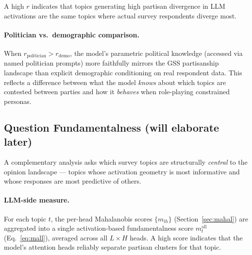 A high $r$ indicates that topics generating high partisan divergence in LLM activations are the same topics where actual survey respondents diverge most.

\paragraph{Politician vs.\ demographic comparison.}
When $r_\text{politician} > r_\text{demo}$, the model's parametric political knowledge (accessed via named politician prompts) more faithfully mirrors the GSS partisanship landscape than explicit demographic conditioning on real respondent data. This reflects a difference between what the model \emph{knows} about which topics are contested between parties and how it \emph{behaves} when role-playing constrained personas.

\subsection{Question Fundamentalness (will elaborate later)}
\label{sec:fundamentalness}

A complementary analysis asks which survey topics are structurally \emph{central} to the opinion landscape --- topics whose activation geometry is most informative and whose responses are most predictive of others.

\paragraph{LLM-side measure.}
For each topic $t$, the per-head Mahalanobis scores $\{m_{lh}\}$ (Section~\ref{sec:mahal}) are aggregated into a single activation-based fundamentalness score $m^\text{all}_t$ (Eq.~\eqref{eq:mall}), averaged across all $L \times H$ heads. A high score indicates that the model's attention heads reliably separate partisan clusters for that topic.

